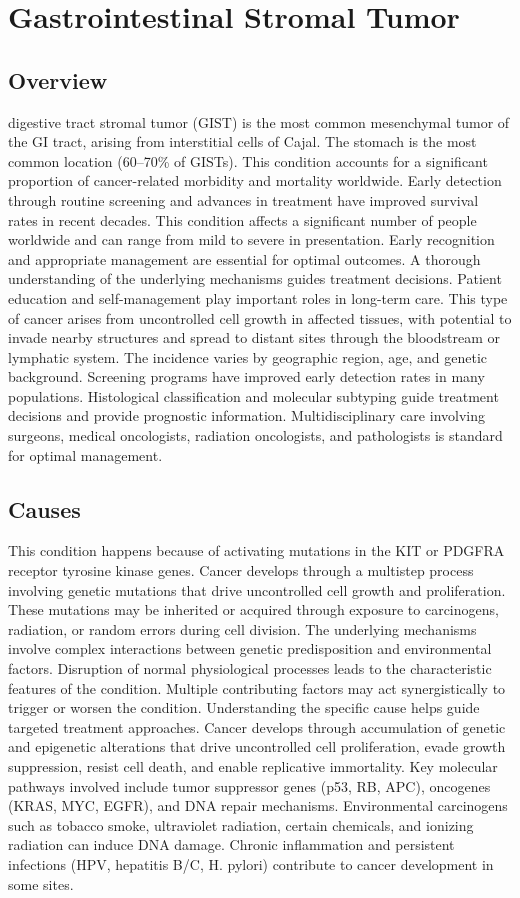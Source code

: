 \chapter{Gastrointestinal Stromal Tumor}
\label{sec:Gastrointestinal Stromal Tumor}

\section{Overview}
digestive tract stromal tumor (GIST) is the most common mesenchymal tumor of the GI tract, arising from interstitial cells of Cajal. The stomach is the most common location (60--70\% of GISTs). This condition accounts for a significant proportion of cancer-related morbidity and mortality worldwide. Early detection through routine screening and advances in treatment have improved survival rates in recent decades. This condition affects a significant number of people worldwide and can range from mild to severe in presentation. Early recognition and appropriate management are essential for optimal outcomes. A thorough understanding of the underlying mechanisms guides treatment decisions. Patient education and self-management play important roles in long-term care. This type of cancer arises from uncontrolled cell growth in affected tissues, with potential to invade nearby structures and spread to distant sites through the bloodstream or lymphatic system. The incidence varies by geographic region, age, and genetic background. Screening programs have improved early detection rates in many populations. Histological classification and molecular subtyping guide treatment decisions and provide prognostic information. Multidisciplinary care involving surgeons, medical oncologists, radiation oncologists, and pathologists is standard for optimal management.
\section{Causes}
This condition happens because of activating mutations in the KIT or PDGFRA receptor tyrosine kinase genes. Cancer develops through a multistep process involving genetic mutations that drive uncontrolled cell growth and proliferation. These mutations may be inherited or acquired through exposure to carcinogens, radiation, or random errors during cell division. The underlying mechanisms involve complex interactions between genetic predisposition and environmental factors. Disruption of normal physiological processes leads to the characteristic features of the condition. Multiple contributing factors may act synergistically to trigger or worsen the condition. Understanding the specific cause helps guide targeted treatment approaches. Cancer develops through accumulation of genetic and epigenetic alterations that drive uncontrolled cell proliferation, evade growth suppression, resist cell death, and enable replicative immortality. Key molecular pathways involved include tumor suppressor genes (p53, RB, APC), oncogenes (KRAS, MYC, EGFR), and DNA repair mechanisms. Environmental carcinogens such as tobacco smoke, ultraviolet radiation, certain chemicals, and ionizing radiation can induce DNA damage. Chronic inflammation and persistent infections (HPV, hepatitis B/C, H. pylori) contribute to cancer development in some sites.
